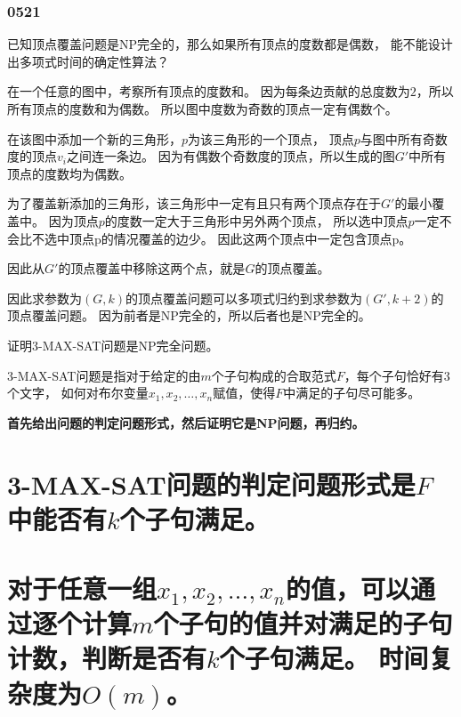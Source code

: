 \section{0521}\label{sec:0521}
\begin{questions}
    \question 已知顶点覆盖问题是NP完全的，那么如果所有顶点的度数都是偶数，
    能不能设计出多项式时间的确定性算法？

    \begin{solution}
        在一个任意的图中，考察所有顶点的度数和。
        因为每条边贡献的总度数为$2$，所以所有顶点的度数和为偶数。
        所以图中度数为奇数的顶点一定有偶数个。

        在该图中添加一个新的三角形，$p$为该三角形的一个顶点，
        顶点$p$与图中所有奇数度的顶点$v_i$之间连一条边。
        因为有偶数个奇数度的顶点，所以生成的图$G'$中所有顶点的度数均为偶数。

        为了覆盖新添加的三角形，该三角形中一定有且只有两个顶点存在于$G'$的最小覆盖中。
        因为顶点$p$的度数一定大于三角形中另外两个顶点，
        所以选中顶点$p$一定不会比不选中顶点p的情况覆盖的边少。
        因此这两个顶点中一定包含顶点p。

        因此从$G'$的顶点覆盖中移除这两个点，就是$G$的顶点覆盖。

        因此求参数为$(G,k)$的顶点覆盖问题可以多项式归约到求参数为$(G',k+2)$的顶点覆盖问题。
        因为前者是NP完全的，所以后者也是NP完全的。

    \end{solution}


    \question 证明3-MAX-SAT问题是NP完全问题。

    3-MAX-SAT问题是指对于给定的由$m$个子句构成的合取范式$F$，每个子句恰好有$3$个文字，
    如何对布尔变量$x_1,x_2, \dots ,x_n$赋值，使得$F$中满足的子句尽可能多。

    \begin{solution}

        \textbf{
            \color{red}
            首先给出问题的判定问题形式，然后证明它是NP问题，再归约。
        }


        \begin{parts}
            \part {
                3-MAX-SAT问题的判定问题形式是$F$中能否有$k$个子句满足。
            }
            \part {
                对于任意一组$x_1,x_2, \dots ,x_n$的值，可以通过逐个计算$m$个子句的值并对满足的子句计数，判断是否有$k$个子句满足。
                时间复杂度为$O(m)$。
            }

\end{parts}
\end{solution}
\end{questions}
